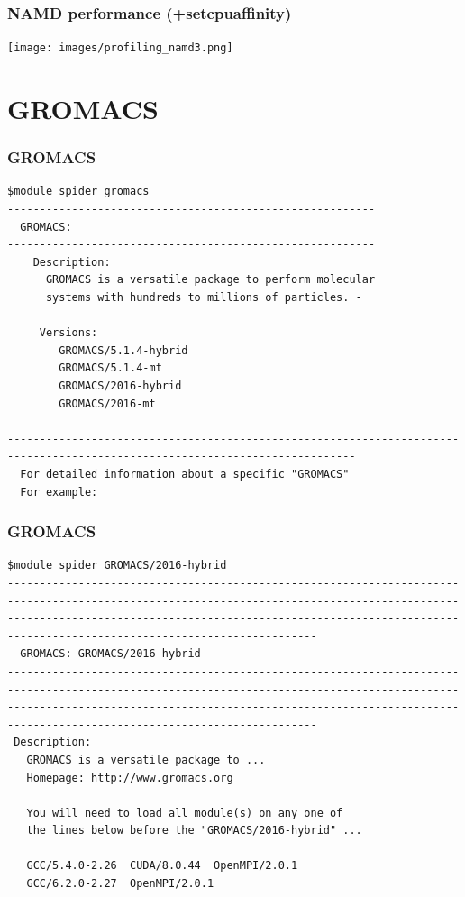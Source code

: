 \begin{frame}
	\frametitle{NAMD performance (+setcpuaffinity)}
        \begin{center}
		\texttt{[image: images/profiling\_namd3.png]}
        \end{center}
\end{frame}



\section{GROMACS}

\begin{frame}[fragile]
	\frametitle{GROMACS}
{\small 
        \begin{verbatim}             
$module spider gromacs
---------------------------------------------------------
  GROMACS:
---------------------------------------------------------
    Description:
      GROMACS is a versatile package to perform molecular 
      systems with hundreds to millions of particles. - 

     Versions:
        GROMACS/5.1.4-hybrid
        GROMACS/5.1.4-mt
        GROMACS/2016-hybrid
        GROMACS/2016-mt

----------------------------------------------------------------------------------------------------------------------------
  For detailed information about a specific "GROMACS" 
  For example:

        \end{verbatim}
}
\end{frame}


\begin{frame}[fragile]
	\frametitle{GROMACS}
  
        \begin{verbatim}             
$module spider GROMACS/2016-hybrid 
------------------------------------------------------------------------------------------------------------------------------------------------------------------------------------------------------------------------------------------------------------------
  GROMACS: GROMACS/2016-hybrid
------------------------------------------------------------------------------------------------------------------------------------------------------------------------------------------------------------------------------------------------------------------
 Description:
   GROMACS is a versatile package to ... 
   Homepage: http://www.gromacs.org 

   You will need to load all module(s) on any one of 
   the lines below before the "GROMACS/2016-hybrid" ...

   GCC/5.4.0-2.26  CUDA/8.0.44  OpenMPI/2.0.1
   GCC/6.2.0-2.27  OpenMPI/2.0.1

        \end{verbatim}

\end{frame}


